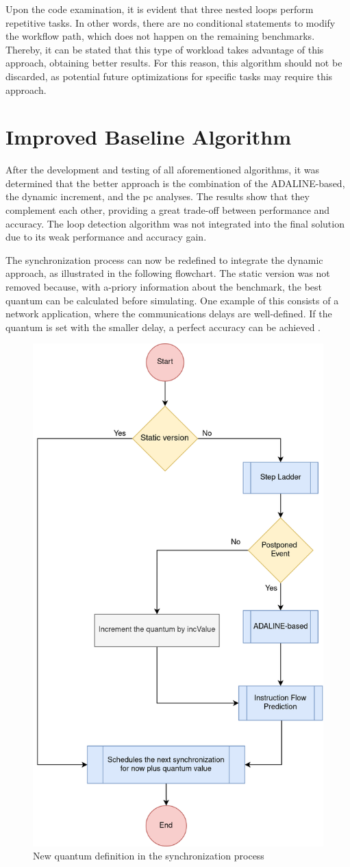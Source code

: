 Upon the code examination, it is evident that three nested loops perform repetitive tasks. In other words, there are no conditional 
statements to modify the workflow path, which does not happen on the remaining benchmarks. Thereby, it can be stated that this type of 
workload takes advantage of this approach, obtaining better results. For this reason, this algorithm should not be discarded, as potential 
future optimizations for specific tasks may require this approach.

\section{Improved Baseline Algorithm}
\label{subsec::finalAlgorithm}

After the development and testing of all aforementioned algorithms, it was determined that the better approach is the combination of the ADALINE-based, 
the dynamic increment, and the \gls{pc} analyses. The results show that they complement each other, providing a great trade-off between performance 
and accuracy. The loop detection algorithm was not integrated into the final solution due to its weak performance and accuracy gain. 

The synchronization process can now be redefined to integrate the dynamic approach, as illustrated in the following flowchart. 
The static version was not removed because, with a-priory information about the benchmark, 
the best quantum can be calculated before simulating. One example of this consists of a network application, where the communications 
delays are well-defined. If the quantum is set with the smaller delay, a perfect accuracy can be achieved \cite{dist-gem5}. 

\begin{figure}[H]
	\centering
 	\includegraphics[width=0.48\linewidth]{Images/NewGlobalSyncEventStatic.png}
 	\caption{New quantum definition in the synchronization process}
	\label{fig_NewGlobalSyncEventStatic}
\end{figure}

